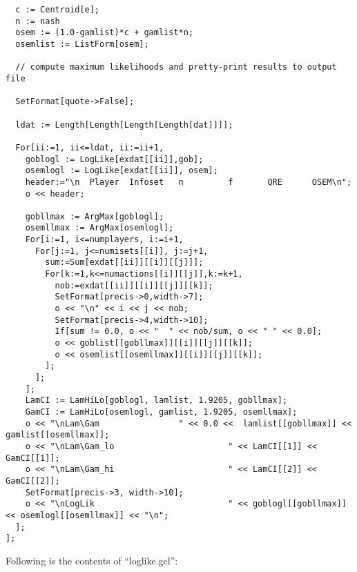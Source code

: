\begin{verbatim}
  c := Centroid[e];
  n := nash
  osem := (1.0-gamlist)*c + gamlist*n;
  osemlist := ListForm[osem];

  // compute maximum likelihoods and pretty-print results to output file

  SetFormat[quote->False];

  ldat := Length[Length[Length[Length[dat]]]];

  For[ii:=1, ii<=ldat, ii:=ii+1,
    goblogl := LogLike[exdat[[ii]],gob];
    osemlogl := LogLike[exdat[[ii]], osem];
    header:="\n  Player  Infoset   n         f       QRE      OSEM\n";
    o << header;

    gobllmax := ArgMax[goblogl];
    osemllmax := ArgMax[osemlogl];
    For[i:=1, i<=numplayers, i:=i+1,
      For[j:=1, j<=numisets[[i]], j:=j+1,
        sum:=Sum[exdat[[ii]][[i]][[j]]];
        For[k:=1,k<=numactions[[i]][[j]],k:=k+1,
          nob:=exdat[[ii]][[i]][[j]][[k]];
          SetFormat[precis->0,width->7];
          o << "\n" << i << j << nob;
          SetFormat[precis->4,width->10];
          If[sum != 0.0, o << "  " << nob/sum, o << " " << 0.0];
          o << goblist[[gobllmax]][[i]][[j]][[k]];
          o << osemlist[[osemllmax]][[i]][[j]][[k]];
        ];
      ];
    ];
    LamCI := LamHiLo[goblogl, lamlist, 1.9205, gobllmax];
    GamCI := LamHiLo[osemlogl, gamlist, 1.9205, osemllmax];
    o << "\nLam\Gam                " << 0.0 <<  lamlist[[gobllmax]] << gamlist[[osemllmax]];
    o << "\nLam\Gam_lo                       " << LamCI[[1]] << GamCI[[1]];
    o << "\nLam\Gam_hi                       " << LamCI[[2]] << GamCI[[2]];
    SetFormat[precis->3, width->10];
    o << "\nLogLik                           " << goblogl[[gobllmax]] << osemlogl[[osemllmax]] << "\n";
  ];
];
\end{verbatim}

\noindent
Following is the contents of ``loglike.gcl'':

